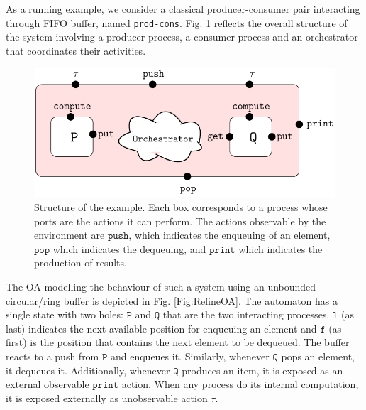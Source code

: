 \documentclass[runningheads]{llncs}
\begin{document}
%



\begin{example}\label{Example:fifo-system} As a running example, we consider a classical producer-consumer pair  interacting through FIFO buffer, named \texttt{prod-cons}.  Fig. \ref{Fig:Architect} reflects the overall structure of the system involving a producer process, a consumer process and an orchestrator that coordinates  their activities. 

\begin{figure}[!ht]
 \centering
   \includegraphics[width=.70\textwidth]{Figures/Architecture.pdf}
   \caption{Structure of the example. Each box corresponds to a process whose ports are the actions it can perform. The  actions observable by the environment are $\texttt{push}$, which indicates the enqueuing of an element, $\texttt{pop}$ which indicates the dequeuing, and $\texttt{print}$ which indicates the production of results. \label{Fig:Architect}} 
\end{figure}


The OA  modelling the behaviour of such a system  using an  unbounded circular/ring buffer is depicted in Fig. \ref{Fig:RefineOA}.  The automaton has a single state with  two holes: $\texttt{P}$ and  $\texttt{Q}$ that are the two interacting processes.  $\texttt{l}$ (as last)  indicates the next available position for  enqueuing an element  and  $\texttt{f}$ (as first) is the position that contains the next element to be dequeued. %
The buffer reacts to a push from $\texttt{P}$ and enqueues it. Similarly, whenever   $\texttt{Q}$ pops an element, it dequeues it. Additionally, whenever $\texttt{Q}$ produces an item, it is exposed as an external observable  $\texttt{print}$ action. 
When any process do its internal computation, it is exposed externally as unobservable action $\tau$. 


\end{example}
\end{document}
